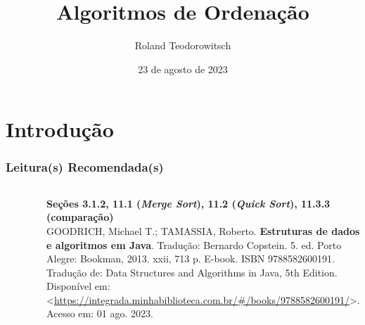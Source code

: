 \documentclass[aspectratio=169]{beamer}
\title[\sc{Algoritmos de Ordenação}]{Algoritmos de Ordenação}
\author[Roland Teodorowitsch]{Roland Teodorowitsch}
\institute[ALEST I - EP - PUCRS]{Algoritmos e Estruturas de Dados I - Escola Politécnica - PUCRS}
\date{23 de agosto de 2023}
\begin{document}
\justifying

\begin{frame}
	\titlepage
\end{frame}

\section{Introdução}

\begin{frame}\frametitle{Leitura(s) Recomendada(s)}

\begin{columns}[T]
\begin{column}{0.15\linewidth}
\vspace{-3mm}
\begin{figure}[h]
	\centering
	\includegraphics[height=0.3\paperheight]{imagens/livro_goodrich.jpg}
\end{figure}
\end{column}
\begin{column}{0.85\linewidth}
\vspace{3mm}
\textbf{Seções 3.1.2, 11.1 (\emph{Merge Sort}), 11.2 (\emph{Quick Sort}), 11.3.3 (comparação)}\\
\scriptsize{GOODRICH, Michael T.; TAMASSIA, Roberto. \textbf{Estruturas de dados e algoritmos em Java}. Tradução: Bernardo Copstein. 5. ed. Porto Alegre: Bookman, 2013. xxii, 713 p. E-book. ISBN 9788582600191. Tradução de: Data Structures and Algorithms in Java, 5th Edition. Disponível em: \textless{}\url{https://integrada.minhabiblioteca.com.br/\#/books/9788582600191/}\textgreater{}. Acesso em: 01 ago. 2023.}
\end{column}
\end{columns}

\end{frame}
\end{document}
